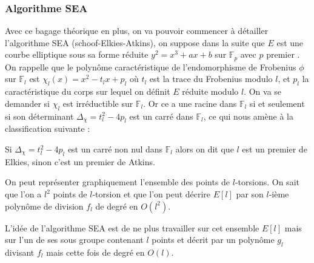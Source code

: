 \documentclass[12pt]{article}
\begin{document}
\subsubsection{Algorithme SEA}
Avec ce bagage théorique en plus, on va pouvoir commencer à détailler l'algorithme SEA (schoof-Elkies-Atkins), on suppose dans la suite que $E$ est une courbe elliptique sous sa forme réduite $y^2 = x^3 + ax +b$ sur $\mathbb{F}_p$ avec $p$ premier . On rappelle que le polynôme caractéristique de l’endomorphisme de Frobenius $\phi$ sur $\mathbb{F}_l$ est $\chi_l(x) = x^2 - t_lx +p_l$ où $t_l$ est la trace du Frobenius modulo $l$, et $p_l$ la caractéristique du corps sur lequel on définit $E$ réduite modulo $l$. On va se demander si $\chi_l$ est irréductible sur $\mathbb{F}_l$. Or ce  a une racine dans $\mathbb{F}_l$ si et seulement si son déterminant $\Delta_{\chi} = t_l^2 - 4p_l$ est un carré dans $\mathbb{F}_l$, ce qui nous amène à la classification suivante :

\begin{defi}
\label{Atkins's prime}
Si $\Delta_{\chi} = t_l^2 - 4p_l$ est un carré non nul dans $\mathbb{F}_l$ alors on dit que $l$ est un premier de Elkies, sinon c'est un premier de Atkins.
\end{defi}
\bigskip
On peut représenter graphiquement l'ensemble des points de $l$-torsions. On sait que l'on a $l^2$ points de $l$-torsion et que l'on peut décrire $E[l]$ par son $l$-ième polynôme de division $f_l$ de degré en $O(l^2)$.


L'idée de l'algorithme SEA est de ne plus travailler sur cet ensemble $E[l]$ mais sur l'un de ses sous groupe contenant $l$ points et décrit par un polynôme $g_l$ divisant $f_l$ mais cette fois de degré en $O(l)$.
\newline
\bigskip
{}
\end{document}
